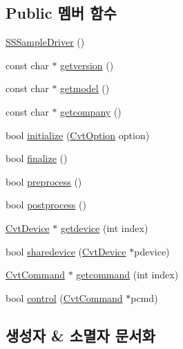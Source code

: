 \subsection*{Public 멤버 함수}
\begin{DoxyCompactItemize}
\item 
\hyperlink{classebiodriver_1_1SSSampleDriver_afac6e5429ff3a9550925c1f62074ff3e}{S\+S\+Sample\+Driver} ()
\item 
const char $\ast$ \hyperlink{classebiodriver_1_1SSSampleDriver_a63d048b6c45e48bfc8f27e6a000a17fb}{getversion} ()
\item 
const char $\ast$ \hyperlink{classebiodriver_1_1SSSampleDriver_ac901fe0974866f1fa494b0bad342c562}{getmodel} ()
\item 
const char $\ast$ \hyperlink{classebiodriver_1_1SSSampleDriver_a34f317b0b97ad61cb6b9efe0f1920e21}{getcompany} ()
\item 
bool \hyperlink{classebiodriver_1_1SSSampleDriver_a604f906153e106692bd5869c7fd8888f}{initialize} (\hyperlink{classstdcvt_1_1CvtOption}{Cvt\+Option} option)
\item 
bool \hyperlink{classebiodriver_1_1SSSampleDriver_a43ab28051c128755cbb639d1c2db7ab2}{finalize} ()
\item 
bool \hyperlink{classebiodriver_1_1SSSampleDriver_a39622e2a63b609136d5e6740a329d450}{preprocess} ()
\item 
bool \hyperlink{classebiodriver_1_1SSSampleDriver_aa6dc852c3a6f9f5798a4ad53db7efbe3}{postprocess} ()
\item 
\hyperlink{classstdcvt_1_1CvtDevice}{Cvt\+Device} $\ast$ \hyperlink{classebiodriver_1_1SSSampleDriver_af4bdb5522559606b177416ec408cd4b4}{getdevice} (int index)
\item 
bool \hyperlink{classebiodriver_1_1SSSampleDriver_a268e69de75c71df87c32ad3d4aa29a91}{sharedevice} (\hyperlink{classstdcvt_1_1CvtDevice}{Cvt\+Device} $\ast$pdevice)
\item 
\hyperlink{classstdcvt_1_1CvtCommand}{Cvt\+Command} $\ast$ \hyperlink{classebiodriver_1_1SSSampleDriver_a273a5a2d7a1b54ba4d6d3989db78d152}{getcommand} (int index)
\item 
bool \hyperlink{classebiodriver_1_1SSSampleDriver_a25e63484cfbe11d3bc741c1cad5b240c}{control} (\hyperlink{classstdcvt_1_1CvtCommand}{Cvt\+Command} $\ast$pcmd)
\end{DoxyCompactItemize}


\subsection{생성자 \& 소멸자 문서화}
